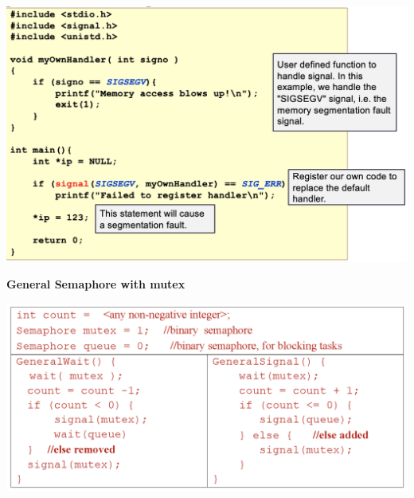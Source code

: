 \documentclass[10pt, a4paper]{article}
\begin{document}
\begin{multicols*}{3}
		\includegraphics[scale=0.37]{./assets/signalHandler.png}

		\textbf{General Semaphore with mutex}

		\includegraphics[scale=.4]{./assets/generalSemaphore.png}









		













	  
	\end{multicols*}
\end{document}
